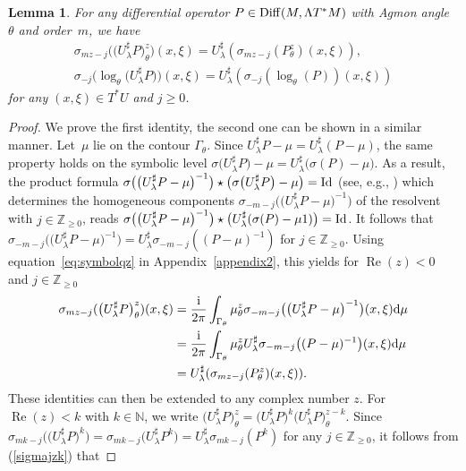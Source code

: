 \documentclass[pdftex]{sigma}
\numberwithin{equation}{section}
\newtheorem{lem}[thm]{Lemma}
\theoremstyle{definition}
\newcommand{\Z}{\mathbb Z}
\newcommand{\N}{\mathbb N}
\begin{document}
\begin{lem} For any differential operator $P\in {\rm Diff}(M,\Lambda T^*M)$ with Agmon angle $\theta$ and order~$m$, we have
	\begin{gather}
		\sigma_{mz-j}\bigl(\bigl(U_\lambda^\sharp P\bigr)_\theta^z\bigr)(x,\xi) = U_\lambda^\sharp (\sigma_{mz-j}(P_\theta^z)(x,\xi) ),\nonumber \\
		\sigma_{-j}\bigl( \log_\theta\bigl(U_\lambda^\sharp P\bigr)\bigr)(x,\xi) = U_\lambda^\sharp (\sigma_{-j}(\log_\theta(P))(x,\xi) )\label{eq:ulambdasharpdef}
	\end{gather}
	for any $(x,\xi)\in T^*U$ and $j\geq 0$.
\end{lem}
\begin{proof} We prove the first identity, the second one can be shown in a similar manner. Let~$\mu$ lie on the contour $\Gamma_\theta$. Since
		$ U_\lambda^\sharp P-\mu= U_\lambda^\sharp (P-\mu) $, the same property holds on the symbolic level 	$ \sigma\bigl(U_\lambda^\sharp P\bigr)-\mu = U_\lambda^\sharp\bigl( \sigma (P)-\mu \bigr)$. As a result, the product formula $\sigma\bigl(\bigl( U_\lambda^\sharp P-\mu\bigr)^{-1}\bigr)\star \bigl(\sigma\bigl(U_\lambda^\sharp P\bigr)-\mu \bigr)={\rm Id}$ (see, e.g., \cite[equation~(4.8.2.2)]{Sc}) which determines the homogeneous components $\sigma_{-m-j}\bigl(\bigl( U_\lambda^\sharp P-\mu\bigr)^{-1}\bigr)$ of the resolvent with $j\in \Z_{\geq 0}$, reads $\sigma\bigl(\bigl( U_\lambda^\sharp P-\mu\bigr)^{-1}\bigr)\star \bigl(U_\lambda^\sharp(\sigma( P)-\mu 1)\bigr)={\rm Id}$. It follows that $\sigma_{-m-j}\bigl(\bigl( U_\lambda^\sharp P-\mu\bigr)^{-1}\bigr)
		=U_\lambda^\sharp\sigma_{-m-j}\left(( P-\mu)^{-1}\right)$ for $j\in \Z_{\geq 0}$. { Using equation~\eqref{eq:symbolqz} in Appendix~\ref{appendix2}}, this yields for $\operatorname{Re}(z)<0$ and $j\in \Z_{\geq 0}$
\begin{align*}
\sigma_{mz-j}( \bigl(U_\lambda^\sharp P\bigr)_\theta^z)(x,\xi)&{}= \frac{{\rm i}}{2\pi} \int_{\Gamma_\theta} \mu_\theta^z \sigma_{-m-j}\bigl(\bigl(U_\lambda^\sharp P-\mu\bigr)^{-1}\bigr)(x,\xi) {\rm d}\mu\\
&{}= \frac{{\rm i}}{2\pi} \int_{\Gamma_\theta} \mu_\theta^z U_\lambda^\sharp\sigma_{-m-j}\bigl((P-\mu)^{-1}\bigr)(x,\xi) {\rm d}\mu\\
&{}= U_\lambda^\sharp(\sigma_{mz-j}(P_\theta^{z})(x,\xi)).
\end{align*}
These identities can then be extended to any complex number $z$. For $\operatorname{Re}(z)<k$ with $k\in \N$, we write $\bigl(U_\lambda^\sharp P\bigr)_\theta^z= \bigl(U_\lambda^\sharp P\bigr)^k \bigl(U_\lambda^\sharp P\bigr)_\theta^{z-k}$. Since $ \sigma_{mk-j} \bigl(\bigl(U_\lambda^\sharp P\bigr)^k\bigr)= \sigma_{mk-j} \bigl(U_\lambda^\sharp P^k\bigr)= U_\lambda^\sharp\sigma_{mk-j} ( P^k)$ for any $j\in \Z_{\geq 0}$, it follows from (\ref{sigmajzk}) that

\end{proof}
\end{document}
